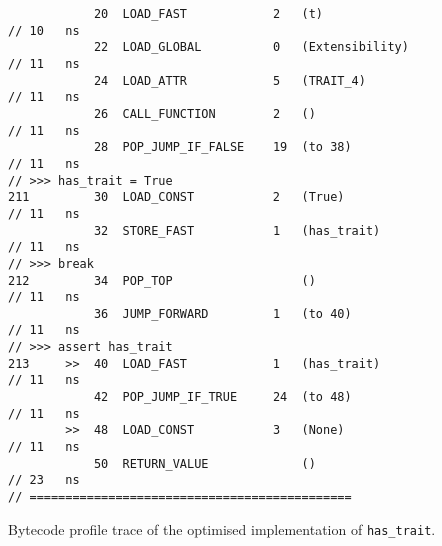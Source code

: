 \begin{code}
\begin{verbatim}
            20  LOAD_FAST            2   (t)                                                        // 10   ns
            22  LOAD_GLOBAL          0   (Extensibility)                                            // 11   ns
            24  LOAD_ATTR            5   (TRAIT_4)                                                  // 11   ns
            26  CALL_FUNCTION        2   ()                                                         // 11   ns
            28  POP_JUMP_IF_FALSE    19  (to 38)                                                    // 11   ns
// >>> has_trait = True
211         30  LOAD_CONST           2   (True)                                                     // 11   ns
            32  STORE_FAST           1   (has_trait)                                                // 11   ns
// >>> break
212         34  POP_TOP                  ()                                                         // 11   ns
            36  JUMP_FORWARD         1   (to 40)                                                    // 11   ns
// >>> assert has_trait
213     >>  40  LOAD_FAST            1   (has_trait)                                                // 11   ns
            42  POP_JUMP_IF_TRUE     24  (to 48)                                                    // 11   ns
        >>  48  LOAD_CONST           3   (None)                                                     // 11   ns
            50  RETURN_VALUE             ()                                                         // 23   ns
// =============================================
    \end{verbatim}
    \caption{Bytecode profile trace of the optimised implementation of \texttt{has_trait}.}
    \label{listing:bytecode-profiles-hastrait-optimised}
\end{code}
